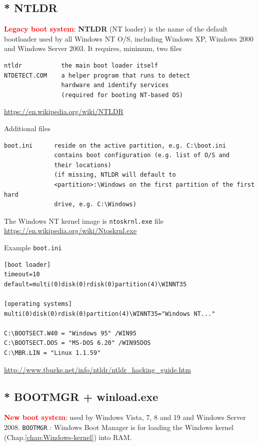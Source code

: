 \subsection{* NTLDR}
\label{sec:NTLDR}



\textcolor{red}{\bf Legacy boot system}:
{\bf NTLDR} (NT loader) is the name of the default bootloader used by all
Windows NT O/S, including Windows XP, Windows 2000 and Windows Server 2003.  It
requires, minimum, two files
\begin{verbatim}
ntldr           the main boot loader itself
NTDETECT.COM    a helper program that runs to detect
                hardware and identify services 
                (required for booting NT-based OS)
\end{verbatim}
\url{https://en.wikipedia.org/wiki/NTLDR}


Additional files
\begin{verbatim}
boot.ini      reside on the active partition, e.g. C:\boot.ini
              contains boot configuration (e.g. list of O/S and 
              their locations) 
              (if missing, NTLDR will default to
              <partition>:\Windows on the first partition of the first hard
              drive, e.g. C:\Windows)
\end{verbatim}

The Windows NT kernel image is \verb!ntoskrnl.exe! file
\url{https://en.wikipedia.org/wiki/Ntoskrnl.exe}

Example \verb!boot.ini!
\begin{verbatim}
[boot loader] 
timeout=10 
default=multi(0)disk(0)rdisk(0)partition(4)\WINNT35 

[operating systems] 
multi(0)disk(0)rdisk(0)partition(4)\WINNT35="Windows NT..." 

C:\BOOTSECT.W40 = "Windows 95" /WIN95 
C:\BOOTSECT.DOS = "MS-DOS 6.20" /WIN95DOS 
C:\MBR.LIN = "Linux 1.1.59"
\end{verbatim}
\url{http://www.tburke.net/info/ntldr/ntldr_hacking_guide.htm}

\subsection{* BOOTMGR + winload.exe}
\label{sec:BOOTMGR}


\textcolor{red}{\bf New boot system}: used by Windows Vista, 7, 8 and 19 and
Windows Server 2008. \verb!BOOTMGR! : Windows Boot Manager is for loading the
Windows kernel (Chap.\ref{chap:Windows-kernel}) into RAM.
  
